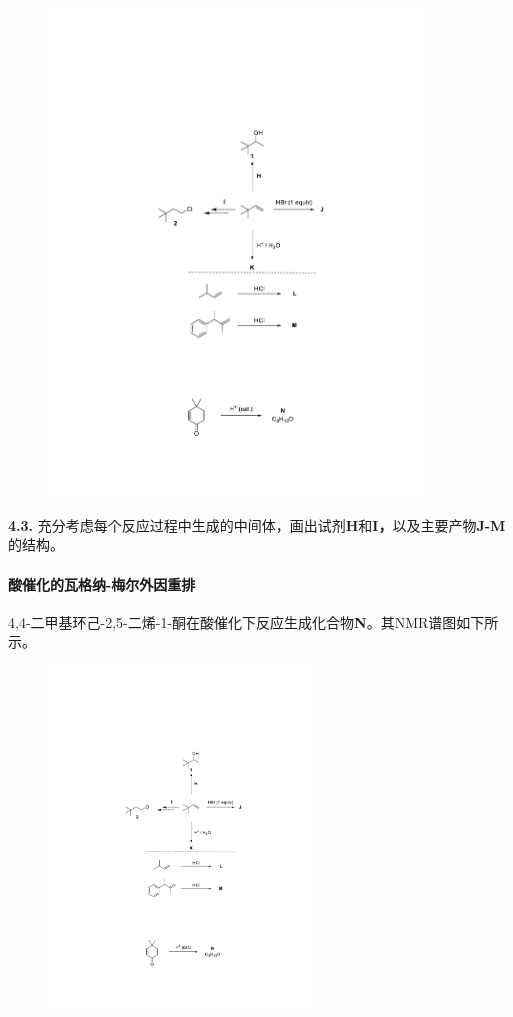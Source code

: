 \begin{figure}[h!]
	\centering
	\includegraphics[width=10cm]{./pic/t4-4.pdf}
\end{figure}

\noindent\textbf{4.3.}
充分考虑每个反应过程中生成的中间体，画出试剂\textbf{H}和\textbf{I，}以及主要产物\textbf{J-M}的结构。

\paragraph{酸催化的瓦格纳-梅尔外因重排}

4,4-二甲基环己-2,5-二烯-1-酮在酸催化下反应生成化合物\textbf{N}。其NMR谱图如下所示。

\begin{figure}[h!]
	\centering
	\includegraphics[width=7cm]{./pic/t4-5.pdf}
\end{figure}


